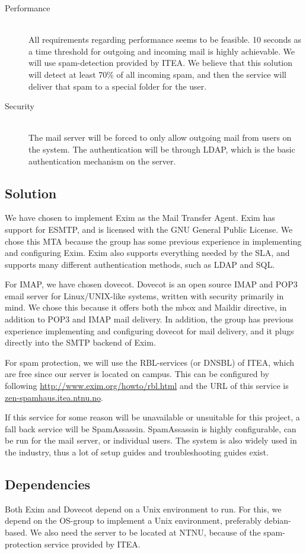 \documentclass[12pt]{article}
\begin{document}
\begin{description}
\item[Performance] \hfill \\
All requirements regarding performance seems to be feasible. 10 seconds
as a time threshold for outgoing and incoming mail is highly achievable.
We will use spam-detection provided by ITEA. We believe that this
solution will detect at least 70\% of all incoming spam, and then the
service will deliver that spam to a special folder for the user.

\item[Security] \hfill \\
The mail server will be forced to only allow outgoing mail from users on
the system. The authentication will be through LDAP, which is the basic
authentication mechanism on the server.

\end{description}
\subsection{Solution}

We have chosen to implement Exim\cite{exim} as the Mail Transfer Agent. Exim has
support for ESMTP, and is licensed with the GNU General Public
License\cite{gnu-license}. We chose this MTA because the group has some previous
experience in implementing and configuring Exim. Exim also supports
everything needed by the SLA, and supports many different authentication
methods, such as LDAP and SQL. 

For IMAP, we have chosen dovecot. Dovecot is an open source IMAP and
POP3 email server for Linux/UNIX-like systems, written with security
primarily in mind\cite{dovecot}. We chose this because it offers both the mbox and
Maildir directive, in addition to POP3 and IMAP mail delivery. In
addition, the group has previous experience implementing and configuring
dovecot for mail delivery, and it plugs directly into the SMTP backend
of Exim.

For spam protection, we will use the RBL-services (or DNSBL) of ITEA,
which are free since our server is located on campus. This can be
configured by following \url{http://www.exim.org/howto/rbl.html} and the URL
of this service is \url{zen-spamhaus.itea.ntnu.no}.

If this service for some reason will be unavailable or unsuitable for
this project, a fall back service will be
SpamAssassin\cite{spamassassin}. SpamAssassin is highly configurable,
can be run for the mail server, or individual users. The system is also
widely used in the industry, thus a lot of setup guides and
troubleshooting guides exist.

\subsection{Dependencies}
Both Exim and Dovecot depend on a Unix environment to run. For this, we
depend on the OS-group to implement a Unix environment, preferably
debian-based.
We also need the server to be located at NTNU, because of the
spam-protection service provided by ITEA. 

\newpage


\end{document}
